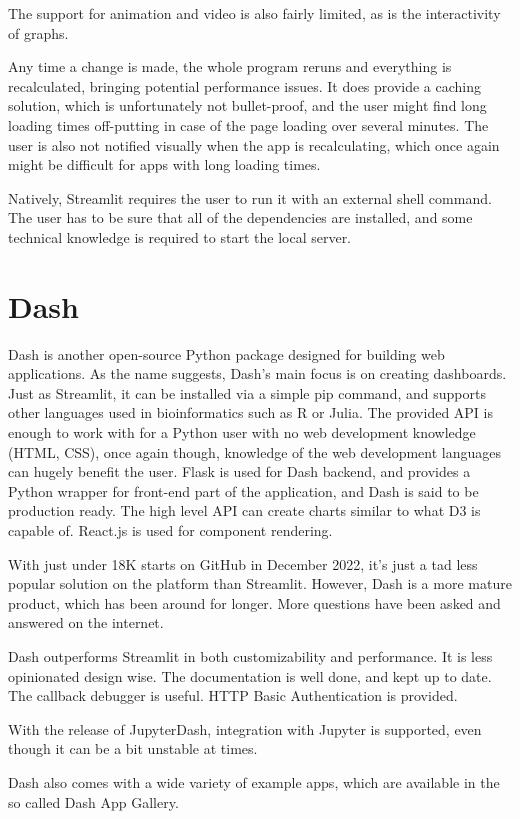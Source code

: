 The support for animation and video is also fairly limited, as is the interactivity of graphs. 

Any time a change is made, the whole program reruns and everything is recalculated, bringing potential performance issues. It does provide a caching solution, which is unfortunately not bullet-proof, and the user might find long loading times off-putting in case of the page loading over several minutes. The user is also not notified visually when the app is recalculating, which once again might be difficult for apps with long loading times.

Natively, Streamlit requires the user to run it with an external shell command. The user has to be sure that all of the dependencies are installed, and some technical knowledge is required to start the local server. 

\section{Dash}
\label{sec:dash}
Dash is another open-source Python package designed for building web applications. As the name suggests, Dash's main focus is on creating dashboards. Just as Streamlit, it can be installed via a simple pip command, and supports other languages used in bioinformatics such as R or Julia. The provided API is enough to work with for a Python user with no web development knowledge (HTML, CSS), once again though, knowledge of the web development languages can hugely benefit the user. Flask is used for Dash backend, and provides a Python wrapper for front-end part of the application, and Dash is said to be production ready. The high level API can create charts similar to what D3 is capable of. React.js is used for component rendering.

With just under 18K starts on GitHub in December 2022, it's just a tad less popular solution on the platform than Streamlit. However, Dash is a more mature product, which has been around for longer. More questions have been asked and answered on the internet. 

Dash outperforms Streamlit in both customizability and performance. It is less opinionated design wise. The documentation is well done, and kept up to date. The callback debugger is useful. HTTP Basic Authentication is provided. 

With the release of JupyterDash, integration with Jupyter is supported, even though it can be a bit unstable at times.

Dash also comes with a wide variety of example apps, which are available in the so called Dash App Gallery.

